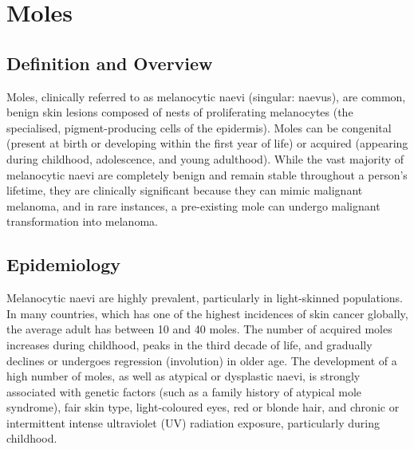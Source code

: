 \chapter{Moles}

\section*{Definition and Overview}
Moles, clinically referred to as melanocytic naevi (singular: naevus), are common, benign skin lesions composed of nests of proliferating melanocytes (the specialised, pigment-producing cells of the epidermis). Moles can be congenital (present at birth or developing within the first year of life) or acquired (appearing during childhood, adolescence, and young adulthood). While the vast majority of melanocytic naevi are completely benign and remain stable throughout a person's lifetime, they are clinically significant because they can mimic malignant melanoma, and in rare instances, a pre-existing mole can undergo malignant transformation into melanoma.

\section*{Epidemiology}
Melanocytic naevi are highly prevalent, particularly in light-skinned populations. In many countries, which has one of the highest incidences of skin cancer globally, the average adult has between 10 and 40 moles. The number of acquired moles increases during childhood, peaks in the third decade of life, and gradually declines or undergoes regression (involution) in older age. The development of a high number of moles, as well as atypical or dysplastic naevi, is strongly associated with genetic factors (such as a family history of atypical mole syndrome), fair skin type, light-coloured eyes, red or blonde hair, and chronic or intermittent intense ultraviolet (UV) radiation exposure, particularly during childhood.

